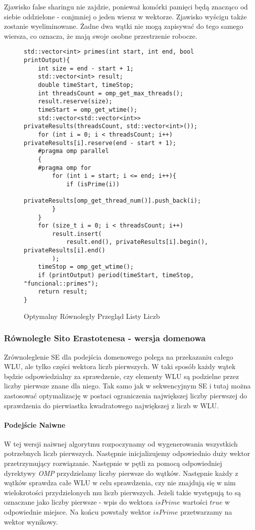 \documentclass{article}
\begin{document}
                    Zjawisko false sharingu nie zajdzie, ponieważ komórki pamięci będą znacząco od siebie oddzielone - conjmniej o jeden wiersz w wektorze. Zjawisko wyścigu także zostanie wyeliminowane. Żadne dwa wątki nie mogą zapisywać do tego samego wiersza, co oznacza, że mają swoje osobne przestrzenie robocze.
                \begin{figure}[H]
                    \begin{verbatim}
std::vector<int> primes(int start, int end, bool printOutput){
    int size = end - start + 1;
    std::vector<int> result;
    double timeStart, timeStop;
    int threadsCount = omp_get_max_threads();
    result.reserve(size);
    timeStart = omp_get_wtime();
    std::vector<std::vector<int>> privateResults(threadsCount, std::vector<int>());
    for (int i = 0; i < threadsCount; i++) privateResults[i].reserve(end - start + 1);
    #pragma omp parallel
    {
    #pragma omp for
        for (int i = start; i <= end; i++){
            if (isPrime(i))
                privateResults[omp_get_thread_num()].push_back(i);
        }
    }
    for (size_t i = 0; i < threadsCount; i++)
        result.insert(
            result.end(), privateResults[i].begin(), privateResults[i].end()
        );
    timeStop = omp_get_wtime();
    if (printOutput) period(timeStart, timeStop, "funcional::primes");
    return result;
}
                    \end{verbatim}
                    \caption{Optymalny Równoległy Przegląd Listy Liczb}
                \end{figure}
                
                
            \subsubsection{Równoległe Sito Erastotenesa - wersja domenowa}
                Zrównoleglenie \gls{SE} dla podejścia domenowego polega na przekazaniu całego \gls{WLU}, ale tylko części wektora liczb pierwszych. W taki sposób każdy wątek będzie odpowiedzialny za sprawdzenie, czy elementy \gls{WLU} są podzielne przez liczby pierwsze znane dla niego. Tak samo jak w sekwencyjnym \gls{SE} i tutaj można zastosować optymalizację w postaci ograniczenia największej liczby pierwszej do sprawdzenia do pierwiastka kwadratowego największej z liczb w \gls{WLU}.
                
                \paragraph{Podejście Naiwne}
                    W tej wersji naiwnej algorytmu rozpoczynamy od wygenerowania wszystkich potrzebnych liczb pierwszych. Następnie inicjalizujemy odpowiednio duży wektor przetrzymujący rozwiązanie. Następnie w pętli za pomocą odpowiedniej dyrektywy \emph{OMP} przydzielamy liczby pierwsze do wątków. Następnie każdy z wątków sprawdza całe \gls{WLU} w celu sprawdzenia, czy nie znajdują się w nim wielokrotości przydzielonych mu liczb pierwszych. Jeżeli takie występują to są oznaczane jako liczby pierwsze - wpis do wektora $isPrime$ wartości $true$ w odpowiednie miejsce. Na końcu powstały wektor $isPrime$ przetwarzamy na wektor wynikowy.
                    
\end{document}
